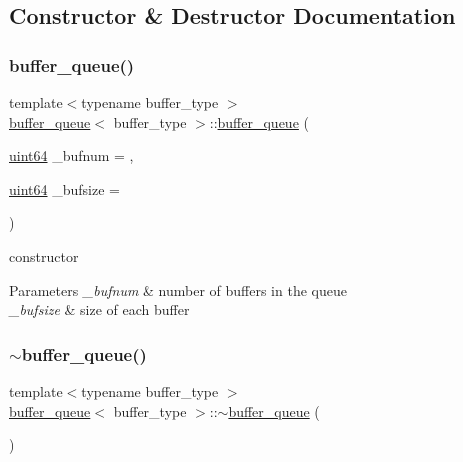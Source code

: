\subsection{Constructor \& Destructor Documentation}
\mbox{\label{structbuffer__queue_acd123387742f7cc4e1e418e7864ca2a1}} 
\subsubsection{\texorpdfstring{buffer\+\_\+queue()}{buffer\_queue()}\hspace{0.1cm}{\footnotesize\ttfamily [1/2]}}
{\footnotesize\ttfamily template$<$typename buffer\+\_\+type $>$ \\
\hyperlink{structbuffer__queue}{buffer\+\_\+queue}$<$ buffer\+\_\+type $>$\+::\hyperlink{structbuffer__queue}{buffer\+\_\+queue} (\begin{DoxyParamCaption}\item[{\hyperlink{types_8h_a60e8696a4678cd348e991a1f172e53f7}{uint64}}]{\+\_\+bufnum = {},  }\item[{\hyperlink{types_8h_a60e8696a4678cd348e991a1f172e53f7}{uint64}}]{\+\_\+bufsize = {} }\end{DoxyParamCaption})\hspace{0.3cm}{\ttfamily [inline]}}



constructor 


\begin{DoxyParams}{Parameters}
{\em \+\_\+bufnum} & number of buffers in the queue \\
\hline
{\em \+\_\+bufsize} & size of each buffer \\
\hline
\end{DoxyParams}
\mbox{\label{structbuffer__queue_a8dda78874230bead5795e510f315dc2c}} 
\subsubsection{\texorpdfstring{$\sim$buffer\+\_\+queue()}{~buffer\_queue()}\hspace{0.1cm}{\footnotesize\ttfamily [1/2]}}
{\footnotesize\ttfamily template$<$typename buffer\+\_\+type $>$ \\
\hyperlink{structbuffer__queue}{buffer\+\_\+queue}$<$ buffer\+\_\+type $>$\+::$\sim$\hyperlink{structbuffer__queue}{buffer\+\_\+queue} (\begin{DoxyParamCaption}{ }\end{DoxyParamCaption})\hspace{0.3cm}{\ttfamily [inline]}}



